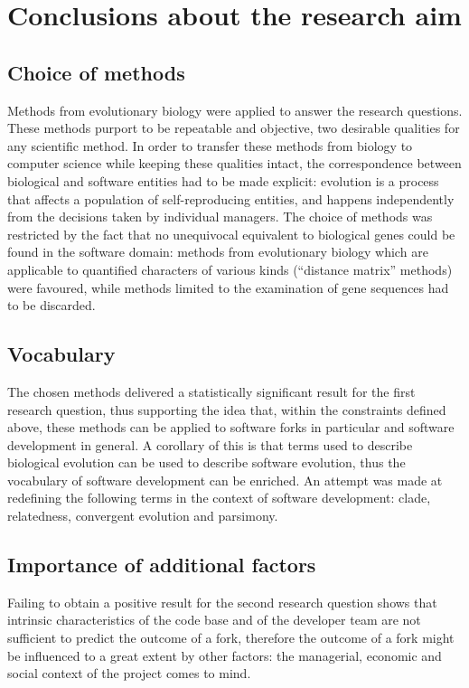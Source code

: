 \section{Conclusions about the research aim}
\subsection{Choice of methods}
Methods from evolutionary biology were applied to answer the research questions. These methods purport to be repeatable and objective, two desirable qualities for any scientific method. In order to transfer these methods from biology to computer science while keeping these qualities intact, the correspondence between biological and software entities had to be made explicit: evolution is a process that affects a population of self-reproducing entities, and happens independently from the decisions taken by individual managers. The choice of methods was restricted by the fact that no unequivocal equivalent to biological genes could be found in the software domain: methods from evolutionary biology which are applicable to quantified characters of various kinds (“distance matrix” methods) were favoured, while methods limited to the examination of gene sequences had to be discarded.

\subsection{Vocabulary}
The chosen methods delivered a statistically significant result for the first research question, thus supporting the idea that, within the constraints defined above, these methods can be applied to software forks in particular and software development in general. A corollary of this is that terms used to describe biological evolution can be used to describe software evolution, thus the vocabulary of software development can be enriched. An attempt was made at redefining the following terms in the context of software development: clade, relatedness, convergent evolution and parsimony.

\subsection{Importance of additional factors}
Failing to obtain a positive result for the second research question shows that intrinsic characteristics of the code base and of the developer team are not sufficient to predict the outcome of a fork, therefore the outcome of a fork might be influenced to a great extent by other factors: the managerial, economic and social context of the project comes to mind.

